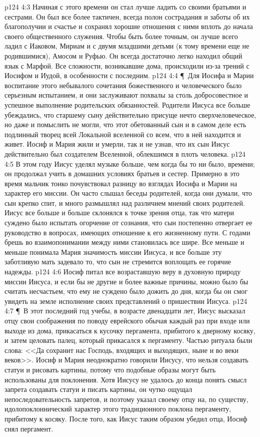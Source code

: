 \vs p124 4:3 Начиная с этого времени он стал лучше ладить со своими братьями и сестрами. Он был все более тактичен, всегда полон сострадания и заботы об их благополучии и счастье и сохранял хорошие отношения с ними вплоть до начала своего общественного служения. Чтобы быть более точным, он лучше всего ладил с Иаковом, Мириам и с двумя младшими детьми (к тому времени еще не родившимися), Амосом и Руфью. Он всегда достаточно легко находил общий язык с Марфой. Все сложности, возникавшие дома, происходили из\hyp{}за трений с Иосифом и Иудой, в особенности с последним.
\vs p124 4:4 \P\ Для Иосифа и Марии воспитание этого небывалого сочетания божественного и человеческого было серьезным испытанием, и они заслуживают похвалы за столь добросовестное и успешное выполнение родительских обязанностей. Родители Иисуса все больше убеждались, что старшему сыну действительно присуще нечто сверхчеловеческое, но даже и помыслить не могли, что этот обетованный сын и в самом деле есть подлинный творец всей Локальной вселенной со всем, что в ней находится и живет. Иосиф и Мария жили и умерли, так и не узнав, что их сын Иисус действительно был создателем Вселенной, облекшимся в плоть человека.
\vs p124 4:5 В этом году Иисус уделял музыке больше, чем когда бы то ни было, времени; он продолжал учить в домашних условиях братьев и сестер. Примерно в это время мальчик тонко почувствовал разницу во взглядах Иосифа и Марии на характер его миссии. Он часто слышал беседы родителей, когда они думали, что сын крепко спит, и много размышлял над различием мнений своих родителей. Иисус все больше и больше склонялся к точке зрения отца, так что матери суждено было испытать огорчение от сознания, что сын постепенно отвергает ее руководство в вопросах, имеющих отношение к его жизненному пути. С годами брешь во взаимопонимании между ними становилась все шире. Все меньше и меньше понимала Мария значимость миссии Иисуса, и все больше эту заботливую мать задевало то, что сын не стремится воплощать ее горячие надежды.
\vs p124 4:6 Иосиф питал все возраставшую веру в духовную природу миссии Иисуса, и если бы не другие и более важные причины, можно было бы считать несчастьем, что ему не суждено было дожить до дня, когда бы он смог увидеть на земле исполнение своих представлений о пришествии Иисуса.
\vs p124 4:7 \P\ В этот последний год учебы, в возрасте двенадцати лет, Иисус высказал отцу свои соображения по поводу еврейского обычая каждый раз при входе или выходе из дома, прикасаться к кусочку пергамента, прибитого к дверному косяку, и затем целовать палец, который прикасался к пергаменту. Частью ритуала были слова: <<Да сохранит нас Господь, входящих и выходящих, ныне и во веки веков>>. Иосиф и Мария неоднократно говорили Иисусу, что нельзя создавать статуи и рисовать картины, потому что подобные образы могут быть использованы для поклонения. Хотя Иисусу не удалось до конца понять смысл запрета создавать статуи и писать картины, он чутко ощущал непоследовательность запретов, и поэтому указал своему отцу на, по существу, идолопоклоннический характер этого традиционного поклона пергаменту, прибитому к косяку. После того, как Иисус таким образом убедил отца, Иосиф снял пергамент.
